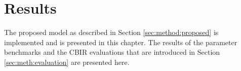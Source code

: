 \chapter{Results}
\label{chapter:results}

The proposed model as described in Section \ref{sec:method:proposed} is implemented and is presented in this chapter. 
The results of the parameter benchmarks and the CBIR evaluations that are introduced in Section \ref{sec:meth:evaluation} are presented here.
%




